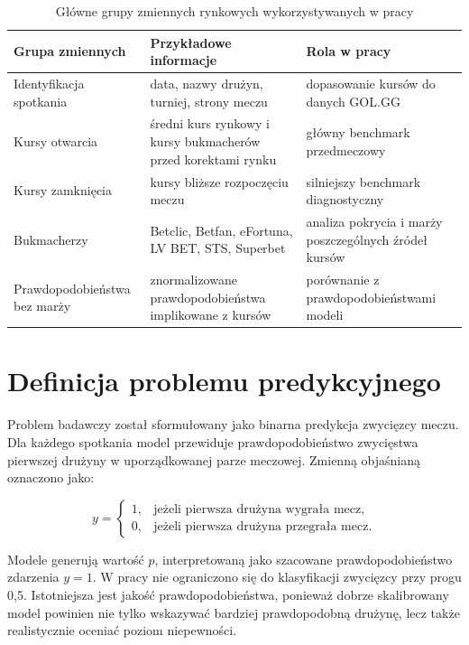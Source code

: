 \begin{table}[H]
    \centering
    \caption{Główne grupy zmiennych rynkowych wykorzystywanych w pracy}
    \label{tab:market_variable_groups}
    \small
    \begin{tabular}{p{3.8cm}p{4.8cm}p{4.8cm}}
        \toprule
        Grupa zmiennych & Przykładowe informacje & Rola w pracy \\
        \midrule
        Identyfikacja spotkania & data, nazwy drużyn, turniej, strony meczu & dopasowanie kursów do danych GOL.GG \\
        Kursy otwarcia & średni kurs rynkowy i kursy bukmacherów przed korektami rynku & główny benchmark przedmeczowy \\
        Kursy zamknięcia & kursy bliższe rozpoczęciu meczu & silniejszy benchmark diagnostyczny \\
        Bukmacherzy & Betclic, Betfan, eFortuna, LV BET, STS, Superbet & analiza pokrycia i marży poszczególnych źródeł kursów \\
        Prawdopodobieństwa bez marży & znormalizowane prawdopodobieństwa implikowane z kursów & porównanie z prawdopodobieństwami modeli \\
        \bottomrule
    \end{tabular}
\end{table}

\section{Definicja problemu predykcyjnego}

Problem badawczy został sformułowany jako binarna predykcja zwycięzcy meczu. Dla każdego spotkania model przewiduje prawdopodobieństwo zwycięstwa pierwszej drużyny w uporządkowanej parze meczowej. Zmienną objaśnianą oznaczono jako:

\begin{equation}
    y =
    \begin{cases}
        1, & \text{jeżeli pierwsza drużyna wygrała mecz,} \\
        0, & \text{jeżeli pierwsza drużyna przegrała mecz.}
    \end{cases}
\end{equation}

Modele generują wartość \(\hat{p}\), interpretowaną jako szacowane prawdopodobieństwo zdarzenia \(y = 1\). W pracy nie ograniczono się do klasyfikacji zwycięzcy przy progu 0{,}5. Istotniejsza jest jakość prawdopodobieństwa, ponieważ dobrze skalibrowany model powinien nie tylko wskazywać bardziej prawdopodobną drużynę, lecz także realistycznie oceniać poziom niepewności.

